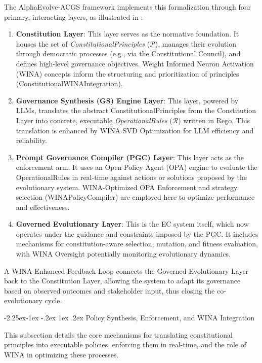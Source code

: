 \documentclass[manuscript,screen,9pt]{acmart}
\makeatletter
\renewcommand\subsection{\@startsection{subsection}{2}{\z@}%
  {-2.25ex\@plus -1ex \@minus -.2ex}%
  {1ex \@plus .2ex}%
  {\normalfont\large\bfseries}}
\makeatother
\begin{document}
The AlphaEvolve-ACGS framework implements this formalization through four primary, interacting layers, as illustrated in :
\begin{enumerate}[leftmargin=*,itemsep=1pt,parsep=1pt]
    \item \textbf{Constitution Layer}: This layer serves as the normative foundation. It houses the set of \textit{ConstitutionalPrinciples} ($\mathcal{P}$), manages their evolution through democratic processes (e.g., via the Constitutional Council), and defines high-level governance objectives. Weight Informed Neuron Activation (WINA) concepts inform the structuring and prioritization of principles (ConstitutionalWINAIntegration).
    \item \textbf{Governance Synthesis (GS) Engine Layer}: This layer, powered by LLMs, translates the abstract ConstitutionalPrinciples from the Constitution Layer into concrete, executable \textit{OperationalRules} ($\mathcal{R}$) written in Rego. This translation is enhanced by WINA SVD Optimization for LLM efficiency and reliability.
    \item \textbf{Prompt Governance Compiler (PGC) Layer}: This layer acts as the enforcement arm. It uses an Open Policy Agent (OPA) engine to evaluate the OperationalRules in real-time against actions or solutions proposed by the evolutionary system. WINA-Optimized OPA Enforcement and strategy selection (WINAPolicyCompiler) are employed here to optimize performance and effectiveness.
    \item \textbf{Governed Evolutionary Layer}: This is the EC system itself, which now operates under the guidance and constraints imposed by the PGC. It includes mechanisms for constitution-aware selection, mutation, and fitness evaluation, with WINA Oversight potentially monitoring evolutionary dynamics.
\end{enumerate}
A WINA-Enhanced Feedback Loop connects the Governed Evolutionary Layer back to the Constitution Layer, allowing the system to adapt its governance based on observed outcomes and stakeholder input, thus closing the co-evolutionary cycle.

\subsection{Policy Synthesis, Enforcement, and WINA Integration}
\label{subsec:policy_synthesis_enforcement} 

This subsection details the core mechanisms for translating constitutional principles into executable policies, enforcing them in real-time, and the role of WINA in optimizing these processes.
\end{document}

